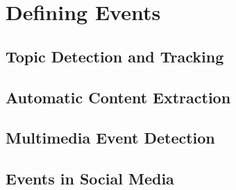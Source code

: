 
\chapter{Defining Events} %

\label{EventDefinition} %


\section{Topic Detection and Tracking}

\section{Automatic Content Extraction}

\section{Multimedia Event Detection}

\section{Events in Social Media}